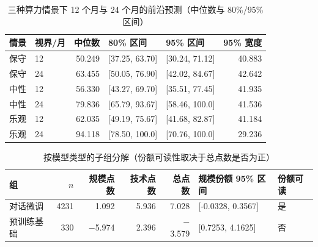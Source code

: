 \begin{table}[htbp]
  \centering
  \caption{三种算力情景下 12 个月与 24 个月的前沿预测（中位数与 80\%/95\% 区间）}
  \label{tab:app-q4-scenario}
  \small
  \begin{tabular}{@{}rlrllr@{}}
    \toprule
    情景 & 视界/月 & 中位数 & 80\% 区间 & 95\% 区间 & 95\% 宽度 \\
    \midrule
    保守 & 12 & 50.249 & [37.25, 63.70] & [30.24, 71.12] & 40.883 \\
    保守 & 24 & 63.455 & [50.05, 76.90] & [42.02, 84.67] & 42.642 \\
    中性 & 12 & 56.330 & [43.27, 69.70] & [35.51, 77.45] & 41.935 \\
    中性 & 24 & 79.836 & [65.79, 93.67] & [58.46, 100.0] & 41.536 \\
    乐观 & 12 & 62.035 & [49.19, 75.67] & [41.68, 82.87] & 41.184 \\
    乐观 & 24 & 94.118 & [78.50, 100.0] & [70.76, 100.0] & 29.236 \\
    \bottomrule
  \end{tabular}
\end{table}

\begin{table}[htbp]
  \centering
  \caption{按模型类型的子组分解（份额可读性取决于总点数是否为正）}
  \label{tab:app-q4-group}
  \small
  \begin{tabular}{@{}lrrrrll@{}}
    \toprule
    组 & $n$ & 规模点数 & 技术点数 & 总点数 & 规模份额 95\% 区间 & 份额可读 \\
    \midrule
    对话微调 & 4231 & 1.092 & 5.936 & 7.028 & [-0.0328, 0.3567] & 是 \\
    预训练基础 & 330 & $-$5.974 & 2.396 & $-$3.579 & [0.7253, 4.1625] & 否 \\
    \bottomrule
  \end{tabular}
\end{table}

